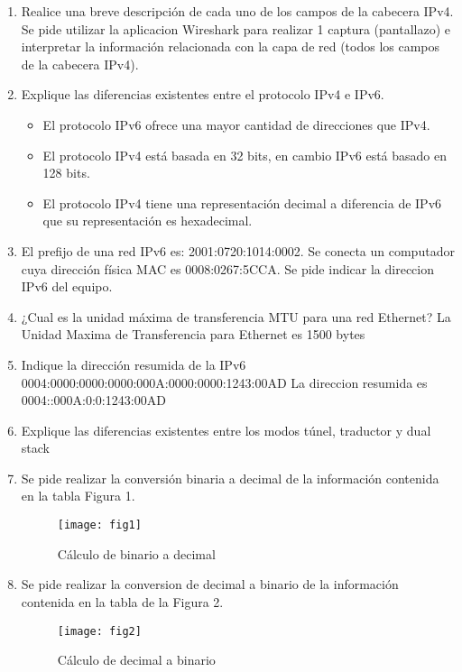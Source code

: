 \documentclass{udparticle}
\begin{document}
\begin{enumerate}
\item Realice una breve descripción de cada uno de los campos de la cabecera IPv4. Se pide utilizar la aplicacion Wireshark para realizar 1 captura (pantallazo) e interpretar la información relacionada con la capa de red (todos los campos de la cabecera IPv4).
\item Explique las diferencias existentes entre el protocolo IPv4 e IPv6.
\begin{itemize}
	\item El protocolo IPv6 ofrece una mayor cantidad de direcciones que IPv4.
	\item El protocolo IPv4 está basada en 32 bits, en cambio IPv6 está basado en 128 bits.
	\item El protocolo IPv4 tiene una representación decimal a diferencia de IPv6 que su representación es hexadecimal.
\end{itemize}
\item El prefijo de una red IPv6 es: 2001:0720:1014:0002. Se conecta un
computador cuya dirección física MAC es 0008:0267:5CCA. Se pide indicar la direccion IPv6 del equipo.
\item ¿Cual es la unidad máxima de transferencia MTU para una red Ethernet?
La Unidad Maxima de Transferencia para Ethernet es 1500 bytes\\
\item Indique la dirección resumida de la IPv6 0004:0000:0000:0000:000A:0000:0000:1243:00AD
La direccion resumida es 0004::000A:0:0:1243:00AD\\
\item Explique las diferencias existentes entre los modos túnel, traductor y dual stack
\item Se pide realizar la conversión binaria a decimal de la información contenida en la tabla Figura 1.
	\begin{figure}[H]
	\centering
	\texttt{[image: fig1]}
	\caption{Cálculo de binario a decimal}
	\end{figure}
\clearpage

\item Se pide realizar la conversion de decimal a binario de la información contenida en la tabla de la Figura 2.
	\begin{figure}[H]
	\centering
	\texttt{[image: fig2]}
	\caption{Cálculo de decimal a binario}
	\end{figure}


\end{enumerate}
\end{document}
